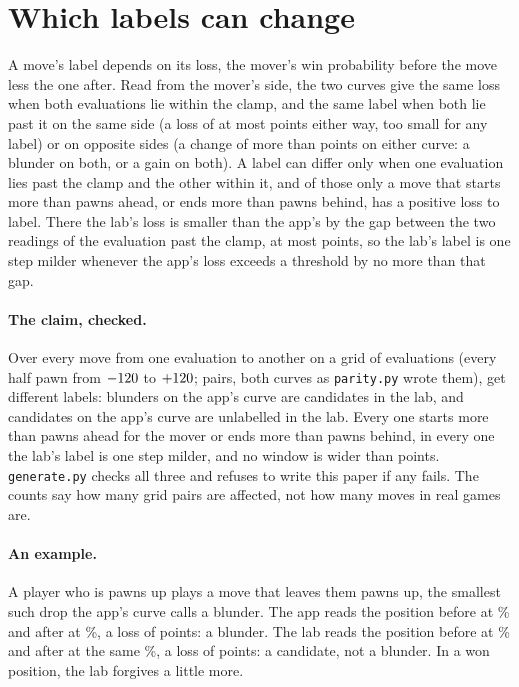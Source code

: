 \documentclass[11pt]{article}
\begin{document}
\section{Which labels can change}

A move's label depends on its loss, the mover's win probability before the move less the one
after. Read from the mover's side, the two curves give the same loss when both evaluations lie
within the clamp, and the same label when both lie past it on the same side (a loss of at most
\MaxGap{} points either way, too small for any label) or on opposite sides (a change of more than
\CrossLoss{} points on either curve: a blunder on both, or a gain on both). A label can differ only when one evaluation lies
past the clamp and the other within it, and of those only a move that starts more than
\LabClampPawns{} pawns ahead, or ends more than \LabClampPawns{} pawns behind, has a positive loss
to label. There the lab's loss is smaller than the app's by the gap between the two readings of
the evaluation past the clamp, at most \MaxGap{} points, so the lab's label is one step milder
whenever the app's loss exceeds a threshold by no more than that gap.

\paragraph{The claim, checked.} Over every move from one evaluation to another on a grid of
\GridPoints{} evaluations (every half pawn from $-120$ to $+120$; \GridPairs{}
pairs, both curves as \texttt{parity.py} wrote them), \GridDiffer{} get different labels: \GridBlunderToCandidate{}
blunders on the app's curve are candidates in the lab, and \GridCandidateToNone{} candidates on
the app's curve are unlabelled in the lab. Every one starts more than \LabClampPawns{} pawns ahead
for the mover or ends more than \LabClampPawns{} pawns behind, in every one the lab's label is one
step milder, and no window is wider than \GridWidest{} points. \texttt{generate.py} checks all
three and refuses to write this paper if any fails. The counts say how many grid pairs are
affected, not how many moves in real games are.

\paragraph{An example.} A player who is \ExampleFrom{} pawns up plays a move that leaves them
\ExampleTo{} pawns up, the smallest such drop the app's curve calls a blunder. The app reads the
position before at \ExampleAppBefore\% and after at \ExampleAfter\%, a loss of
\ExampleAppLoss{} points: a blunder. The lab reads the position before at \ExampleLabBefore\% and
after at the same \ExampleAfter\%, a loss of \ExampleLabLoss{} points: a candidate, not a
blunder. In a won position, the lab forgives a little more.
\end{document}
